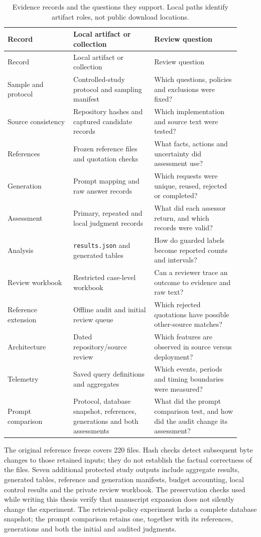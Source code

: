 \begin{longtable}{@{}p{0.26\linewidth}p{0.32\linewidth}p{0.34\linewidth}@{}}
\caption{Evidence records and the questions they support. Local paths identify artifact roles, not public download locations.}\label{tab:evidence-records}\\
\toprule
Record & Local artifact or collection & Review question \\
\midrule
\endfirsthead
\toprule
Record & Local artifact or collection & Review question \\
\midrule
\endhead
Sample and protocol & Controlled-study protocol and sampling manifest & Which questions, policies and exclusions were fixed? \\
Source consistency & Repository hashes and captured candidate records & Which implementation and source text were tested? \\
References & Frozen reference files and quotation checks & What facts, actions and uncertainty did assessment use? \\
Generation & Prompt mapping and raw answer records & Which requests were unique, reused, rejected or completed? \\
Assessment & Primary, repeated and local judgment records & What did each assessor return, and which records were valid? \\
Analysis & \texttt{results.json} and generated tables & How do guarded labels become reported counts and intervals? \\
Review workbook & Restricted case-level workbook & Can a reviewer trace an outcome to evidence and raw text? \\
Reference extension & Offline audit and initial review queue & Which rejected quotations have possible other-source matches? \\
Architecture & Dated repository/source review & Which features are observed in source versus deployment? \\
Telemetry & Saved query definitions and aggregates & Which events, periods and timing boundaries were measured? \\
Prompt comparison & Protocol, database snapshot, references, generations and both assessments & What did the prompt comparison test, and how did the audit change its assessment? \\
\bottomrule
\end{longtable}

The original reference freeze covers 220 files. Hash checks detect subsequent byte changes to those retained inputs; they do not establish the factual correctness of the files. Seven additional protected study outputs include aggregate results, generated tables, reference and generation manifests, budget accounting, local control results and the private review workbook. The preservation checks used while writing this thesis verify that manuscript expansion does not silently change the experiment. The retrieval-policy experiment lacks a complete database snapshot; the prompt comparison retains one, together with its references, generations and both the initial and audited judgments.

